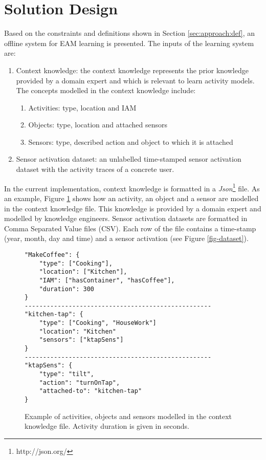 \section{Solution Design}
\label{sec:approach:solution}

Based on the constraints and definitions shown in Section \ref{sec:approach:def}, an offline system for EAM learning is presented. The inputs of the learning system are:

\begin{enumerate}
 \item Context knowledge: the context knowledge represents the prior knowledge provided by a domain expert and which is relevant to learn activity models. The concepts modelled in the context knowledge include: 
 \begin{enumerate}
  \item Activities: type, location and IAM
  \item Objects: type, location and attached sensors
  \item Sensors: type, described action and object to which it is attached
 \end{enumerate}
 
 \item Sensor activation dataset: an unlabelled time-stamped sensor activation dataset with the activity traces of a concrete user.
\end{enumerate}

In the current implementation, context knowledge is formatted in a \textit{Json}\footnote{http://json.org/} file. As an example, Figure \ref{fig-context-json} shows how an activity, an object and a sensor are modelled in the context knowledge file. This knowledge is provided by a domain expert and modelled by knowledge engineers. Sensor activation datasets are formatted in Comma Separated Value files (CSV). Each row of the file contains a time-stamp (year, month, day and time) and a sensor activation (see Figure \ref{fig-dataset}).

\begin{figure}[htbp]
\begin{small}
\begin{lstlisting}
"MakeCoffee": {
	"type": ["Cooking"],
	"location": ["Kitchen"],
	"IAM": ["hasContainer", "hasCoffee"],
	"duration": 300
}
---------------------------------------------------
"kitchen-tap": {
	"type": ["Cooking", "HouseWork"]
	"location": "Kitchen"
	"sensors": ["ktapSens"]
}
---------------------------------------------------
"ktapSens": {
	"type": "tilt",
	"action": "turnOnTap",
	"attached-to": "kitchen-tap"
}
\end{lstlisting}
\end{small}
\caption{Example of activities, objects and sensors modelled in the context knowledge file. Activity duration is given in seconds.}
\label{fig-context-json}
\end{figure}

